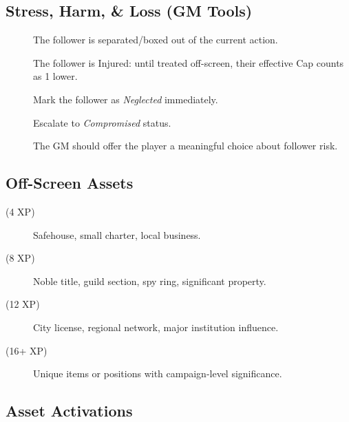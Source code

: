 \subsection{Stress, Harm, \& Loss (GM Tools)}
\label{subsec:follower-stress}

\begin{description}
    \item[] The follower is separated/boxed out of the current action. 
    \item[] The follower is Injured: until treated off-screen, their effective Cap counts as 1 lower. 
    \item[] Mark the follower as \emph{Neglected} immediately. 
    \item[] Escalate to \emph{Compromised} status. 
    \item[] The GM should offer the player a meaningful choice about follower risk. 
\end{description}

\subsection{Off-Screen Assets}
\label{subsec:off-screen-assets}

\begin{description}
\item[ (4 XP)] Safehouse, small charter, local business. 
\item[ (8 XP)] Noble title, guild section, spy ring, significant property. 
\item[ (12 XP)] City license, regional network, major institution influence. 
\item[ (16+ XP)] Unique items or positions with campaign-level significance. 
\end{description}

\subsection{Asset Activations}
\label{subsec:asset-activations}

